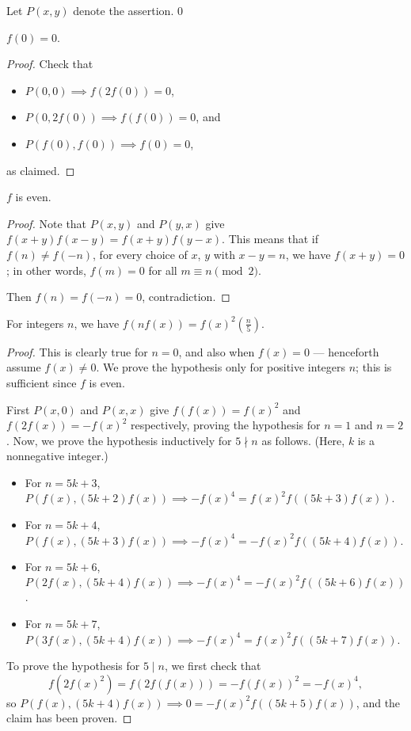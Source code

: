 Let $P(x,y)$ denote the assertion.
\setcounter{claim}0
\begin{claim}
    $f(0)=0$.
\end{claim}
\begin{proof}
    Check that
    \begin{itemize}[itemsep=0em]
        \item $P(0,0)\implies f(2f(0))=0$,
        \item $P(0,2f(0))\implies f(f(0))=0$, and
        \item $P(f(0),f(0))\implies f(0)=0$,
    \end{itemize}
    as claimed.
\end{proof}
\begin{claim}
    $f$ is even.
\end{claim}
\begin{proof}
    Note that $P(x,y)$ and $P(y,x)$ give $f(x+y)f(x-y)=f(x+y)f(y-x)$. This means that if $f(n)\ne f(-n)$, for every choice of $x$, $y$ with $x-y=n$, we have $f(x+y)=0$; in other words, $f(m)=0$ for all $m\equiv n\pmod2$.

    Then $f(n)=f(-n)=0$, contradiction.
\end{proof}
\begin{claim}
    For integers $n$, we have $f(nf(x))=f(x)^2\left(\frac n5\right)$.
\end{claim}
\begin{proof}
    This is clearly true for $n=0$, and also when $f(x)=0$ --- henceforth assume $f(x)\ne0$. We prove the hypothesis only for positive integers $n$; this is sufficient since $f$ is even.

    First $P(x,0)$ and $P(x,x)$ give $f(f(x))=f(x)^2$ and $f(2f(x))=-f(x)^2$ respectively, proving the hypothesis for $n=1$ and $n=2$. Now, we prove the hypothesis inductively for $5\nmid n$ as follows. (Here, $k$ is a nonnegative integer.)
    \begin{itemize}[itemsep=0em]
        \item For $n=5k+3$, $P(f(x),(5k+2)f(x))\implies-f(x)^4=f(x)^2f( (5k+3)f(x))$.
        \item For $n=5k+4$, $P(f(x),(5k+3)f(x))\implies-f(x)^4=-f(x)^2f( (5k+4)f(x))$.
        \item For $n=5k+6$, $P(2f(x),(5k+4)f(x))\implies-f(x)^4=-f(x)^2f( (5k+6)f(x))$.
        \item For $n=5k+7$, $P(3f(x),(5k+4)f(x))\implies-f(x)^4=f(x)^2f( (5k+7)f(x))$.
    \end{itemize}

    To prove the hypothesis for $5\mid n$, we first check that \[f(2f(x)^2)=f(2f(f(x)))=-f(f(x))^2=-f(x)^4,\]
    so $P(f(x),(5k+4)f(x))\implies0=-f(x)^2f( (5k+5)f(x))$, and the claim has been proven.
\end{proof}

